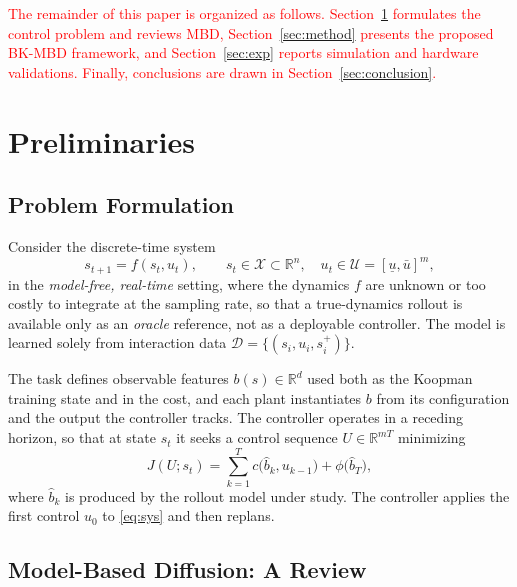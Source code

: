 \documentclass[letterpaper,10pt,conference]{ieeeconf}
\newcommand{\nd}[1]{\textcolor{red}{#1}}
\newcommand{\bkmbd}{\textsc{BK-MBD}}
\begin{document}
\nd{The remainder of this paper is organized as follows.
Section~\ref{sec:prelim} formulates the control problem and reviews MBD, Section~\ref{sec:method} presents the proposed \bkmbd{} framework, and Section~\ref{sec:exp} reports simulation and hardware validations.
Finally, conclusions are drawn in Section~\ref{sec:conclusion}.}

\section{Preliminaries}\label{sec:prelim}

\subsection{Problem Formulation}\label{subsec:problem}

Consider the discrete-time system
\begin{equation}
s_{t+1} = f(s_t, u_t), \qquad
s_t \in \mathcal{X} \subset \mathbb{R}^{n},\quad
u_t \in \mathcal{U} = [\underline{u}, \bar{u}]^{m},
\label{eq:sys}
\end{equation}
in the \emph{model-free, real-time} setting, where the dynamics $f$ are unknown or too costly to integrate at the sampling rate, so that a true-dynamics rollout is available only as an \emph{oracle} reference, not as a deployable controller.
The model is learned solely from interaction data $\mathcal{D} = \{(s_i, u_i, s_i^{+})\}$.

The task defines observable features $b(s) \in \mathbb{R}^{d}$ used both as the Koopman training state and in the cost, and each plant instantiates $b$ from its configuration and the output the controller tracks.
The controller operates in a receding horizon, so that at state $s_t$ it seeks a control sequence $U \in \mathbb{R}^{mT}$ minimizing
\begin{equation}
J(U; s_t) = \sum_{k=1}^{T} c\big(\hat{b}_k, u_{k-1}\big)
+ \phi\big(\hat{b}_T\big),
\label{eq:cost}
\end{equation}
where $\hat b_k$ is produced by the rollout model under study. The controller applies the first control $u_0$ to \eqref{eq:sys} and then replans.

\subsection{Model-Based Diffusion: A Review}\label{subsec:mbd}
\end{document}
